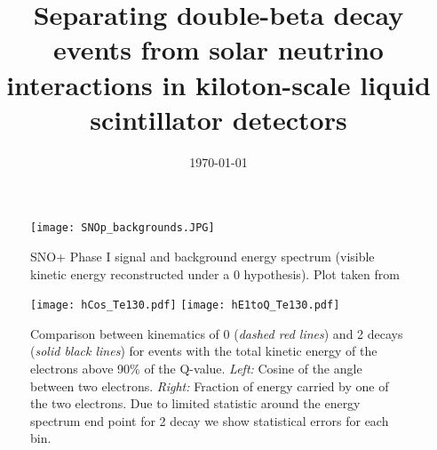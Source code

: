



\graphicspath{{plots/}}

\linenumbers
{}

\title{Separating double-beta decay events from solar neutrino
  interactions in kiloton-scale liquid scintillator detectors}


\begin{abstract}

\end{abstract}

\date{\today}

\maketitle

\newpage
\tableofcontents
\newpage

\linenumbers\relax %



\begin{figure}[ht]
  \centering
  \texttt{[image: SNOp\_backgrounds.JPG]}
  \caption{SNO+ Phase I signal and background energy spectrum (visible
    kinetic energy reconstructed under a 0{\nbb} hypothesis). Plot
    taken from~\cite{SNOp_paper}}
  \label{fig:SNOp_bkgs}
\end{figure}

\begin{figure*}[ht]
  \centering
  \texttt{[image: hCos\_Te130.pdf]}
  \texttt{[image: hE1toQ\_Te130.pdf]}
  \caption{Comparison between kinematics of 0{\nbb} (\emph{dashed red
      lines}) and 2{\nbb} decays (\emph{solid black lines}) for events
    with the total kinetic energy of the electrons above 90\% of the
    Q-value. \emph{Left:} Cosine of the angle between two
    electrons. \emph{Right:} Fraction of energy carried by one of the
    two electrons. Due to limited statistic around the energy spectrum
    end point for 2{\nbb} decay we show statistical errors for each
    bin.}
  \label{fig:Kinematics}
\end{figure*}


\clearpage %


\clearpage %

